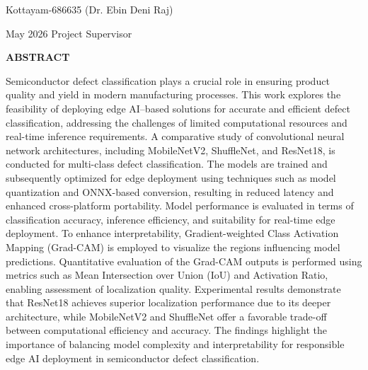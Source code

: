 \documentclass[12pt,a4wide]{report}
\theoremstyle{plain}
\theoremstyle{definition}
\theoremstyle{remark}
\begin{document}
\noindent Kottayam-686635  \hfill ({Dr. Ebin Deni Raj})

\noindent May 2026 \hfill Project Supervisor

\clearpage






\begin{center}
{\Large{\bf{ABSTRACT}}}
\end{center}


Semiconductor defect classification plays a crucial role in ensuring product quality and yield in modern manufacturing processes. This work explores the feasibility 
of deploying edge AI–based solutions for accurate and efficient defect classification, addressing the challenges of limited computational resources and real-time inference requirements. A comparative study of convolutional neural network architectures, including MobileNetV2, ShuffleNet, and ResNet18, is conducted for multi-class defect classification.
The models are trained and subsequently optimized for edge deployment using techniques such as model quantization and ONNX-based conversion, resulting in reduced latency and enhanced cross-platform portability. Model performance is evaluated in terms of classification accuracy, inference efficiency, and suitability for real-time edge deployment. To enhance interpretability, Gradient-weighted Class Activation Mapping (Grad-CAM) is employed to visualize the regions influencing model predictions. Quantitative evaluation of the Grad-CAM outputs is performed using metrics such as Mean Intersection over Union (IoU) and Activation Ratio, enabling assessment of localization quality. Experimental results demonstrate that ResNet18 achieves superior localization performance due to its deeper architecture, while MobileNetV2 and ShuffleNet offer a favorable trade-off between computational efficiency and accuracy. The findings highlight the importance of balancing model complexity and interpretability for responsible edge AI deployment in semiconductor defect classification.

\clearpage



\tableofcontents
\clearpage
\listoffigures
\listoftables


\newpage

\setcounter{page}{1}








\nocite{golub} \nocite{gerla}\nocite{m1}\nocite{chang}


\end{document}
